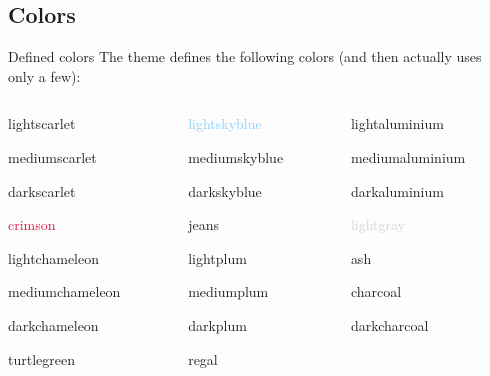 \documentclass[11pt,c]{beamer}
\begin{document}
\subsection{Colors}
	\begin{frame}{Defined colors}
		The theme defines the following colors (and then actually uses only a few):
		\medskip
		\begin{columns}[t, onlytextwidth]
			\begin{column}{0.3\textwidth}\centering
				\textcolor{lightscarlet}{lightscarlet}
				
				\textcolor{mediumscarlet}{mediumscarlet}
				
				\textcolor{darkscarlet}{darkscarlet}
				
				\textcolor{crimson}{crimson}
				
				\textcolor{lightchameleon}{lightchameleon}
				
				\textcolor{mediumchameleon}{mediumchameleon}
				
				\textcolor{darkchameleon}{darkchameleon}
				
				\textcolor{turtlegreen}{turtlegreen}
				
				
				
				
			\end{column}
			\begin{column}{0.3\textwidth}\centering
				\textcolor{lightskyblue}{lightskyblue}
				
				\textcolor{mediumskyblue}{mediumskyblue}
				
				\textcolor{darkskyblue}{darkskyblue}
				
				\textcolor{jeans}{jeans}
				
				\textcolor{lightplum}{lightplum}
				
				\textcolor{mediumplum}{mediumplum}
				
				\textcolor{darkplum}{darkplum}
				
				\textcolor{regal}{regal}
				
			\end{column}
			\begin{column}{0.3\textwidth}\centering
				\textcolor{lightaluminium}{lightaluminium}
				
				\textcolor{mediumaluminium}{mediumaluminium}
				
				\textcolor{darkaluminium}{darkaluminium}
				
				\textcolor{lightgray}{lightgray}
				
				\textcolor{ash}{ash}
				
				\textcolor{charcoal}{charcoal}
				
				\textcolor{darkcharcoal}{darkcharcoal}
			\end{column}
		\end{columns}
	\end{frame}
\end{document}

